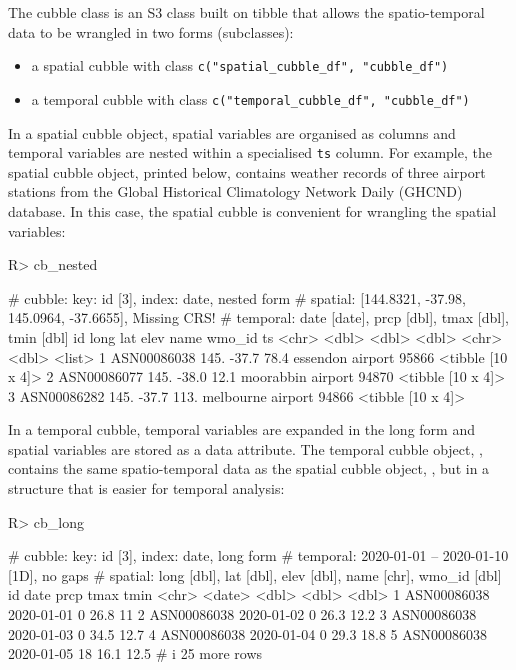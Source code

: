 \documentclass[
  shortnames]{jss}
\providecommand{\tightlist}{%
  \setlength{\itemsep}{0pt}\setlength{\parskip}{0pt}}
\begin{document}
The cubble class is an S3 class built on tibble that allows the spatio-temporal data to be wrangled in two forms (subclasses):

\begin{itemize}
\tightlist
\item
  a spatial cubble with class \texttt{c("spatial\_cubble\_df",\ "cubble\_df")}
\item
  a temporal cubble with class \texttt{c("temporal\_cubble\_df",\ "cubble\_df")}
\end{itemize}

In a spatial cubble object, spatial variables are organised as columns and temporal variables are nested within a specialised \texttt{ts} column. For example, the spatial cubble object,  printed below, contains weather records of three airport stations from the Global Historical Climatology Network Daily (GHCND) database. In this case, the spatial cubble is convenient for wrangling the spatial variables:

\begin{CodeChunk}
\begin{CodeInput}
R> cb_nested
\end{CodeInput}
\begin{CodeOutput}
# cubble:   key: id [3], index: date, nested form
# spatial:  [144.8321, -37.98, 145.0964, -37.6655], Missing CRS!
# temporal: date [date], prcp [dbl], tmax [dbl], tmin [dbl]
  id           long   lat  elev name              wmo_id ts               
  <chr>       <dbl> <dbl> <dbl> <chr>              <dbl> <list>           
1 ASN00086038  145. -37.7  78.4 essendon airport   95866 <tibble [10 x 4]>
2 ASN00086077  145. -38.0  12.1 moorabbin airport  94870 <tibble [10 x 4]>
3 ASN00086282  145. -37.7 113.  melbourne airport  94866 <tibble [10 x 4]>
\end{CodeOutput}
\end{CodeChunk}

In a temporal cubble, temporal variables are expanded in the long form and spatial variables are stored as a data attribute. The temporal cubble object, , contains the same spatio-temporal data as the spatial cubble object, , but in a structure that is easier for temporal analysis:

\begin{CodeChunk}
\begin{CodeInput}
R> cb_long
\end{CodeInput}
\begin{CodeOutput}
# cubble:   key: id [3], index: date, long form
# temporal: 2020-01-01 -- 2020-01-10 [1D], no gaps
# spatial:  long [dbl], lat [dbl], elev [dbl], name [chr], wmo_id [dbl]
  id          date        prcp  tmax  tmin
  <chr>       <date>     <dbl> <dbl> <dbl>
1 ASN00086038 2020-01-01     0  26.8  11  
2 ASN00086038 2020-01-02     0  26.3  12.2
3 ASN00086038 2020-01-03     0  34.5  12.7
4 ASN00086038 2020-01-04     0  29.3  18.8
5 ASN00086038 2020-01-05    18  16.1  12.5
# i 25 more rows
\end{CodeOutput}
\end{CodeChunk}
\end{document}
